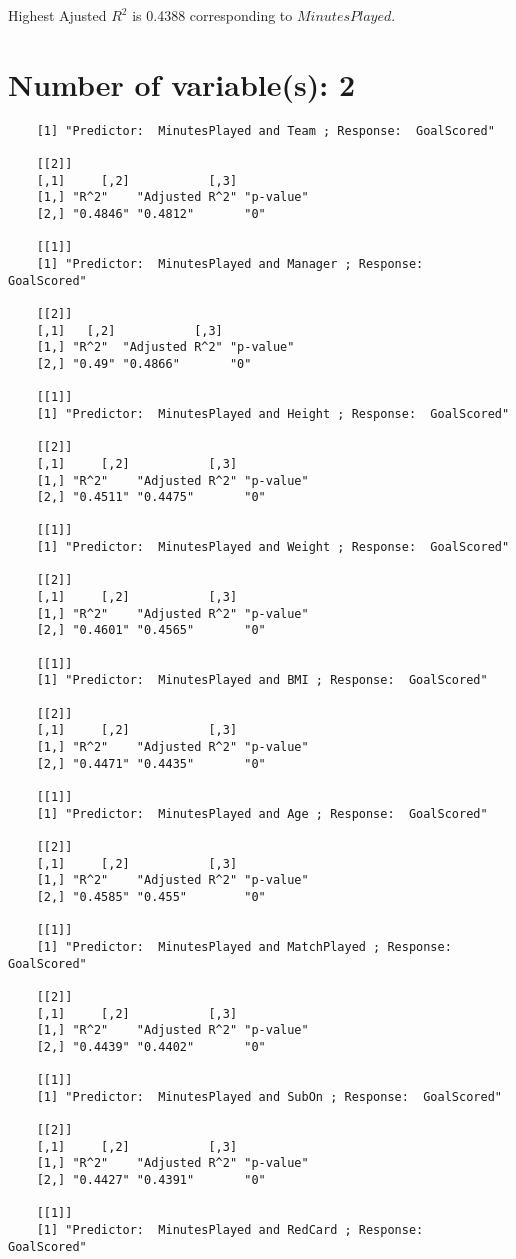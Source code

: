 \documentclass[12pt]{article}
\begin{document}
	Highest Ajusted $ R^2 $ is 0.4388 corresponding to $ MinutesPlayed $.
	
	\section{Number of variable(s): 2}
	\begin{verbatim}
	[1] "Predictor:  MinutesPlayed and Team ; Response:  GoalScored"
	
	[[2]]
	[,1]     [,2]           [,3]     
	[1,] "R^2"    "Adjusted R^2" "p-value"
	[2,] "0.4846" "0.4812"       "0"      
	
	[[1]]
	[1] "Predictor:  MinutesPlayed and Manager ; Response:  GoalScored"
	
	[[2]]
	[,1]   [,2]           [,3]     
	[1,] "R^2"  "Adjusted R^2" "p-value"
	[2,] "0.49" "0.4866"       "0"      
	
	[[1]]
	[1] "Predictor:  MinutesPlayed and Height ; Response:  GoalScored"
	
	[[2]]
	[,1]     [,2]           [,3]     
	[1,] "R^2"    "Adjusted R^2" "p-value"
	[2,] "0.4511" "0.4475"       "0"      
	
	[[1]]
	[1] "Predictor:  MinutesPlayed and Weight ; Response:  GoalScored"
	
	[[2]]
	[,1]     [,2]           [,3]     
	[1,] "R^2"    "Adjusted R^2" "p-value"
	[2,] "0.4601" "0.4565"       "0"      
	
	[[1]]
	[1] "Predictor:  MinutesPlayed and BMI ; Response:  GoalScored"
	
	[[2]]
	[,1]     [,2]           [,3]     
	[1,] "R^2"    "Adjusted R^2" "p-value"
	[2,] "0.4471" "0.4435"       "0"      
	
	[[1]]
	[1] "Predictor:  MinutesPlayed and Age ; Response:  GoalScored"
	
	[[2]]
	[,1]     [,2]           [,3]     
	[1,] "R^2"    "Adjusted R^2" "p-value"
	[2,] "0.4585" "0.455"        "0"      
	
	[[1]]
	[1] "Predictor:  MinutesPlayed and MatchPlayed ; Response:  GoalScored"
	
	[[2]]
	[,1]     [,2]           [,3]     
	[1,] "R^2"    "Adjusted R^2" "p-value"
	[2,] "0.4439" "0.4402"       "0"      
	
	[[1]]
	[1] "Predictor:  MinutesPlayed and SubOn ; Response:  GoalScored"
	
	[[2]]
	[,1]     [,2]           [,3]     
	[1,] "R^2"    "Adjusted R^2" "p-value"
	[2,] "0.4427" "0.4391"       "0"      
	
	[[1]]
	[1] "Predictor:  MinutesPlayed and RedCard ; Response:  GoalScored"
	

\end{verbatim}
\end{document}
